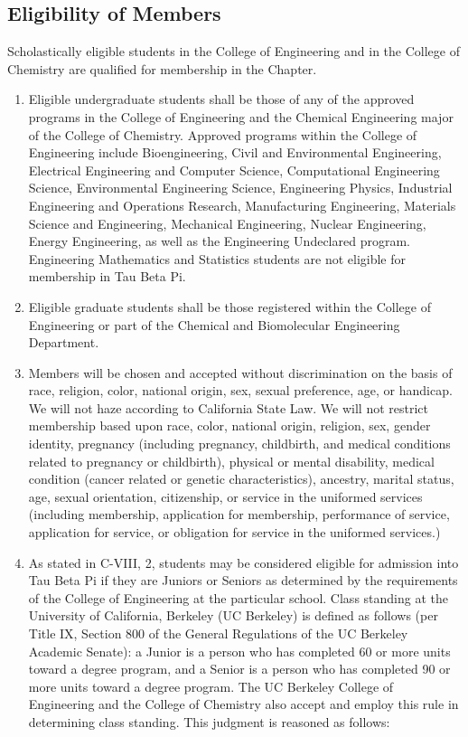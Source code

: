 \documentclass{article}
\begin{document}
	\subsection{Eligibility of Members}
	Scholastically eligible students in the College of Engineering and in the College of Chemistry are qualified for membership in the Chapter.
	\begin{enumerate}[\indent (a)]
		\item Eligible undergraduate students shall be those of any of the approved programs in the College of Engineering and the Chemical Engineering major of the College of Chemistry. Approved programs within the College of Engineering include Bioengineering, Civil and Environmental Engineering, Electrical Engineering and Computer Science, Computational Engineering Science, Environmental Engineering Science, Engineering Physics, Industrial Engineering and Operations Research, Manufacturing Engineering, Materials Science and Engineering, Mechanical Engineering, Nuclear Engineering, Energy Engineering, as well as the Engineering Undeclared program. Engineering Mathematics and Statistics students are not eligible for membership in Tau Beta Pi.
		\item Eligible graduate students shall be those registered within the College of Engineering or part of the Chemical and Biomolecular Engineering Department.
		\item Members will be chosen and accepted without discrimination on the basis of race, religion, color, national origin, sex, sexual preference, age, or handicap. We will not haze according to California State Law. We will not restrict membership based upon race, color, national origin, religion, sex, gender identity, pregnancy (including pregnancy, childbirth, and medical conditions related to pregnancy or childbirth), physical or mental disability, medical condition (cancer related or genetic characteristics), ancestry, marital status, age, sexual orientation, citizenship, or service in the uniformed services (including membership, application for membership, performance of service, application for service, or obligation for service in the uniformed services.)
		\item As stated in C-VIII, 2, students may be considered eligible for admission into Tau Beta Pi if they are Juniors or Seniors as determined by the requirements of the College of Engineering at the particular school. Class standing at the University of California, Berkeley (UC Berkeley) is defined as follows (per Title IX, Section 800 of the General Regulations of the UC Berkeley Academic Senate): a Junior is a person who has completed 60 or more units toward a degree program, and a Senior is a person who has completed 90 or more units toward a degree program. The UC Berkeley College of Engineering and the College of Chemistry also accept and employ this rule in determining class standing. This judgment is reasoned as follows:

\end{enumerate}
\end{document}
